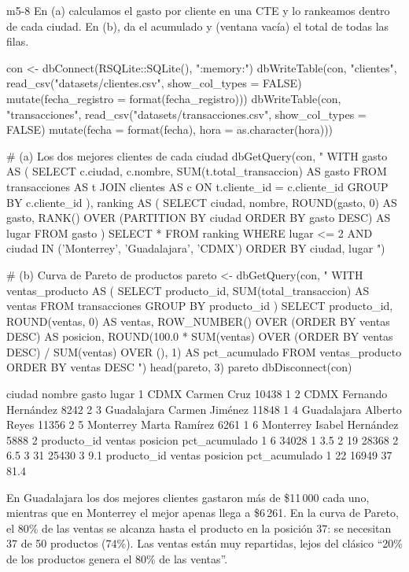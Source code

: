 \begin{solucion}{m5-8}
En (a) calculamos el gasto por cliente en una CTE y lo rankeamos dentro de
cada ciudad. En (b),  da el
acumulado y  (ventana vacía) el total de todas
las filas.

\begin{rcode}
con <- dbConnect(RSQLite::SQLite(), ":memory:")
dbWriteTable(con, "clientes",
             read_csv("datasets/clientes.csv", show_col_types = FALSE) %
               mutate(fecha_registro = format(fecha_registro)))
dbWriteTable(con, "transacciones",
             read_csv("datasets/transacciones.csv",
                      show_col_types = FALSE) %
               mutate(fecha = format(fecha), hora = as.character(hora)))

# (a) Los dos mejores clientes de cada ciudad
dbGetQuery(con, "
  WITH gasto AS (
    SELECT c.ciudad, c.nombre, SUM(t.total_transaccion) AS gasto
    FROM transacciones AS t
    JOIN clientes AS c ON t.cliente_id = c.cliente_id
    GROUP BY c.cliente_id
  ),
  ranking AS (
    SELECT ciudad, nombre, ROUND(gasto, 0) AS gasto,
           RANK() OVER (PARTITION BY ciudad ORDER BY gasto DESC) AS lugar
    FROM gasto
  )
  SELECT * FROM ranking
  WHERE lugar <= 2 AND ciudad IN ('Monterrey', 'Guadalajara', 'CDMX')
  ORDER BY ciudad, lugar
")

# (b) Curva de Pareto de productos
pareto <- dbGetQuery(con, "
  WITH ventas_producto AS (
    SELECT producto_id, SUM(total_transaccion) AS ventas
    FROM transacciones
    GROUP BY producto_id
  )
  SELECT producto_id, ROUND(ventas, 0) AS ventas,
         ROW_NUMBER() OVER (ORDER BY ventas DESC) AS posicion,
         ROUND(100.0 * SUM(ventas) OVER (ORDER BY ventas DESC) /
               SUM(ventas) OVER (), 1) AS pct_acumulado
  FROM ventas_producto
  ORDER BY ventas DESC
")
head(pareto, 3)
pareto %
dbDisconnect(con)
\end{rcode}

\begin{rsalida}
       ciudad             nombre gasto lugar
1        CDMX        Carmen Cruz 10438     1
2        CDMX Fernando Hernández  8242     2
3 Guadalajara     Carmen Jiménez 11848     1
4 Guadalajara      Alberto Reyes 11356     2
5   Monterrey      Marta Ramírez  6261     1
6   Monterrey   Isabel Hernández  5888     2
  producto_id ventas posicion pct_acumulado
1           6  34028        1           3.5
2          19  28368        2           6.5
3          31  25430        3           9.1
  producto_id ventas posicion pct_acumulado
1          22  16949       37          81.4
\end{rsalida}

En Guadalajara los dos mejores clientes gastaron más de \$11\,000 cada uno,
mientras que en Monterrey el mejor apenas llega a \$6\,261. En la curva de
Pareto, el 80\% de las ventas se alcanza hasta el producto en la posición
37: se necesitan 37 de 50 productos (74\%). Las ventas están muy
repartidas, lejos del clásico ``20\% de los productos genera el 80\% de las
ventas''.
\end{solucion}

